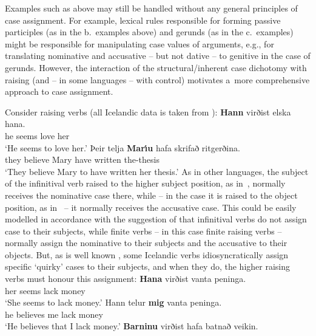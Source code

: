 \documentclass[output=paper]{langsci/langscibook}
\begin{document}
Examples such as above may still be handled without any general principles of case assignment.  For example, lexical rules responsible for forming passive participles (as in the b.~examples above) and gerunds (as in the c.~examples) might be responsible for manipulating case values of arguments, e.g., for translating nominative and accusative – but not dative – to genitive in the case of gerunds.  However, the interaction of the structural/inherent case dichotomy with raising (and – in some languages – with control) motivates a~more comprehensive approach to case assignment.

Consider  raising verbs (all Icelandic data is taken from \citealt[304–305]{SKG92}):
\eal
\label{isl:nom}
\ex
\gll  \textbf{Hann} virðist elska hana.\\
      he\NOM{} seems love\INF{} her\ACC{}\\
\glt  `He seems to love her.'
\ex
\gll  Þeir telja \textbf{Mar{\'\i}u} hafa skrifað ritgerðina. \\
      they believe Mary\ACC{} have\INF{} written the-thesis\\
\glt    `They believe Mary to have written her thesis.'
\zl
As in other languages, the subject of the infinitival verb raised to the higher subject position, as in~, normally receives the nominative case there, while – in the case it is raised to the object position, as in~ – it normally receives the accusative case.  This could be easily modelled in accordance with the suggestion of \citet[30]{ps2} that infinitival verbs do not assign case to their subjects, while finite verbs – in this case finite raising verbs – normally assign the nominative to their subjects and the accusative to their objects.  But, as is well known \citep{Andrews82a-u-kopiert,zae:mal:83,ZMT85a}, some Icelandic verbs idiosyncratically assign specific `quirky’ cases to their subjects, and when they do, the higher raising verbs must honour this assignment:
\eal
\label{isl:acc}
\ex
\gll   \textbf{Hana} virðist vanta peninga. \\
      her\ACC{} seems lack\INF{} money\\
\glt    `She seems to lack money.'
\ex
 \gll   Hann telur \textbf{mig} vanta peninga. \\
      he\NOM{} believes me\ACC{} lack\INF{} money\\
\glt    `He believes that I lack money.'
\zl
\eal
\label{isl:dat}
\ex
\gll   \textbf{Barninu} virðist hafa batnað veikin. \\
\end{document}
